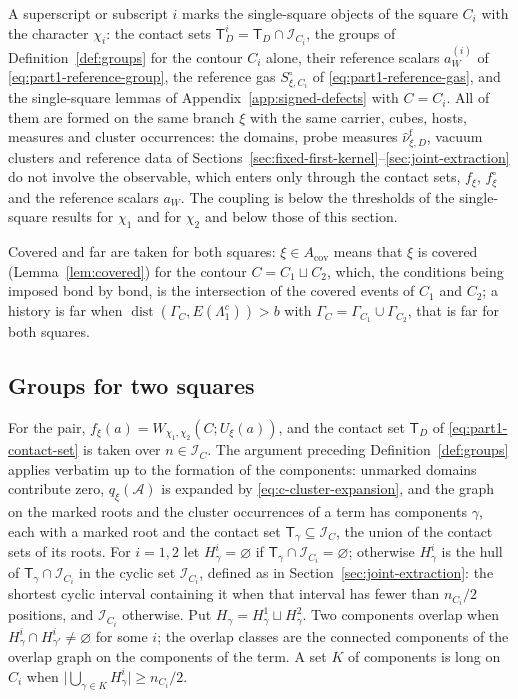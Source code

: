 A superscript or subscript $i$ marks the single-square objects of the square $C_i$ with the character $\chi_i$: the contact sets $\mathsf T^i_D=\mathsf T_D\cap\mathcal I_{C_i}$, the groups of Definition~\ref{def:groups} for the contour $C_i$ alone, their reference scalars $a^{(i)}_W$ of \eqref{eq:part1-reference-group}, the reference gas $S^\circ_{\xi,C_i}$ of \eqref{eq:part1-reference-gas}, and the single-square lemmas of Appendix~\ref{app:signed-defects} with $C=C_i$. All of them are formed on the same branch $\xi$ with the same carrier, cubes, hosts, measures and cluster occurrences: the domains, probe measures $\widehat\nu^{\mathrm f}_{\xi,D}$, vacuum clusters and reference data of Sections~\ref{sec:fixed-first-kernel}--\ref{sec:joint-extraction} do not involve the observable, which enters only through the contact sets, $f_\xi$, $f^\circ_\xi$ and the reference scalars $a_W$. The coupling is below the thresholds of the single-square results for $\chi_1$ and for $\chi_2$ and below those of this section.

Covered and far are taken for both squares: $\xi\in A_{\mathrm{cov}}$ means that $\xi$ is covered (Lemma~\ref{lem:covered}) for the contour $C=C_1\sqcup C_2$, which, the conditions being imposed bond by bond, is the intersection of the covered events of $C_1$ and $C_2$; a history is far when $\operatorname{dist}(\Gamma_C,E(\Lambda_1^c))>b$ with $\Gamma_C=\Gamma_{C_1}\cup\Gamma_{C_2}$, that is far for both squares.

\subsection{Groups for two squares}\label{sec:two-loops-groups}
For the pair, $f_\xi(a)=W_{\chi_1,\chi_2}(C;U_\xi(a))$, and the contact set $\mathsf T_D$ of \eqref{eq:part1-contact-set} is taken over $n\in\mathcal I_C$. The argument preceding Definition~\ref{def:groups} applies verbatim up to the formation of the components: unmarked domains contribute zero, $q_\xi(\mathcal A)$ is expanded by \eqref{eq:c-cluster-expansion}, and the graph on the marked roots and the cluster occurrences of a term has components $\gamma$, each with a marked root and the contact set $\mathsf T_\gamma\subseteq\mathcal I_C$, the union of the contact sets of its roots. For $i=1,2$ let $H^i_\gamma=\varnothing$ if $\mathsf T_\gamma\cap\mathcal I_{C_i}=\varnothing$; otherwise $H^i_\gamma$ is the hull of $\mathsf T_\gamma\cap\mathcal I_{C_i}$ in the cyclic set $\mathcal I_{C_i}$, defined as in Section~\ref{sec:joint-extraction}: the shortest cyclic interval containing it when that interval has fewer than $n_{C_i}/2$ positions, and $\mathcal I_{C_i}$ otherwise. Put $H_\gamma=H^1_\gamma\sqcup H^2_\gamma$. Two components overlap when $H^i_\gamma\cap H^i_{\gamma'}\neq\varnothing$ for some $i$; the overlap classes are the connected components of the overlap graph on the components of the term. A set $K$ of components is long on $C_i$ when $\bigl|\bigcup_{\gamma\in K}H^i_\gamma\bigr|\geq n_{C_i}/2$.

